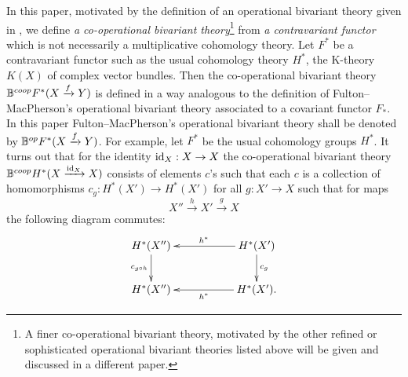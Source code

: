 \documentclass[a4paper]{amsart}
\begin{document}
In this paper, motivated by the definition of an operational bivariant theory given in \cite[\S 8.1]{FM}, we define \emph{a co-operational bivariant theory}\footnote{A finer co-operational bivariant theory, motivated by the other refined or sophisticated operational bivariant theories listed above will be given and discussed in a different paper.} from \emph{a contravariant functor} which is not necessarily a multiplicative cohomology theory. Let $F^*$ be a contravariant functor such as the usual cohomology theory $H^*$, the K-theory $K(X)$ of complex vector bundles. Then the co-operational bivariant theory $\mathbb B^{coop}F^*(X \xrightarrow f Y)$ is defined in a way analogous to the definition of Fulton--MacPherson's operational bivariant theory associated to a covariant functor $F_*$. In this paper Fulton--MacPherson's operational bivariant theory shall be denoted by $\mathbb B^{op}F^*(X \xrightarrow f Y)$. For example, let $F^*$ be the usual cohomology groups $H^*$. It turns out that for the identity $\operatorname{id}_X:X \to X$ the co-operational bivariant 
theory $\mathbb B^{coop}H^*(X \xrightarrow {\operatorname{id}_X} X)$ consists of elements $c$'s such that each $c$ is a collection of homomorphisms $c_g: H^*(X') \to H^*(X')$ for all $g:X' \to X$ such that for maps 
\begin{equation}\label{maps}
X'' \xrightarrow h X' \xrightarrow g X
\end{equation}
the following diagram commutes:
\begin{equation}\label{cd1}
\xymatrix
{H^*(X'') \ar[d]_{c_{g \circ h}} && H^*(X')\ar[ll]_{h^*} \ar[d]^{c_g}\\
H^*(X'') && H^*(X') \ar[ll]^{h^*}.
}
\end{equation}
\end{document}
